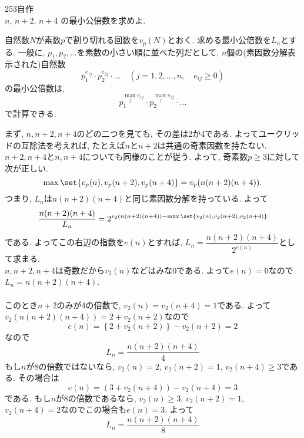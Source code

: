 \begin{thm}{253}{}{自作} \quad \\
$n$, $n+2$, $n+4$ の最小公倍数を求めよ.
\end{thm}

自然数$N$が素数$p$で割り切れる回数を$v_{p}(N)$とおく. 求める最小公倍数を$L_n$とする. 一般に, $p_1,p_2,\dots$を素数の小さい順に並べた列だとして, $n$個の(素因数分解表示された)自然数
\[
p_{1}^{e_{1j}}\cdot p_2^{e_{2j}} \cdot \dots \quad (j=1,2,\dots, n,\quad e_{ij} \geq 0)
\]
の最小公倍数は, 
\[p_1^{\max_{j} e_{1j}}\cdot p_2^{\max_{j} e_{2j}}\cdot \dots \]
で計算できる. \par 
まず, $n,n+2,n+4$のどの二つを見ても, その差は2か4である. よってユークリッドの互除法を考えれば, たとえば$n$と$n+2$は共通の奇素因数を持たない. $n+2,n+4$と$n,n+4$についても同様のことが従う. よって, 奇素数$p\geq 3$に対して次が正しい. 
\[\max{\set{v_{p}(n),v_{p}(n+2),v_{p}(n+4)}} = v_{p}(n(n+2)(n+4)).\]
つまり,  $L_n$は$n(n+2)(n+4)$と同じ素因数分解を持っている. よって
\[\dfrac{n(n+2)(n+4)}{L_n} = 2^{v_2(n(n+2)(n+4))- \max{\set{v_2(n), v_2(n+2), v_2(n+4)}}}\]
である. よってこの右辺の指数を$e(n)$とすれば, $L_n = \dfrac{n(n+2)(n+4)}{2^{e(n)}}$として求まる. \\
$n,n+2,n+4$は奇数だから$v_2(n)$などはみな0である. よって$e(n) = 0$なので$L_n=n(n+2)(n+4)$. \\
 \\
このとき$n+2$のみが4の倍数で, $v_2(n) = v_2(n+4) = 1$である. よって$v_2(n(n+2)(n+4)) = 2+v_2(n+2)$なので
\[e(n) = \left\{ 2+v_2(n+2)\right\} - v_2(n+2) = 2\]
なので
\[L_n = \dfrac{n(n+2)(n+4)}{4}\]
 もし$n$が8の倍数ではないなら, $v_2(n) = 2$, $v_2(n+2) = 1$, $v_2(n+4) \geq 3$である. その場合は
\[e(n) = (3+v_2(n+4)) - v_2(n+4) = 3 \]
である. もし$n$が8の倍数であるなら, $v_2(n)\geq 3$, $v_2(n+2) = 1$, $v_2(n+4) = 2$なのでこの場合も$e(n) = 3$. よって
\[L_n = \dfrac{n(n+2)(n+4)}{8}\]

